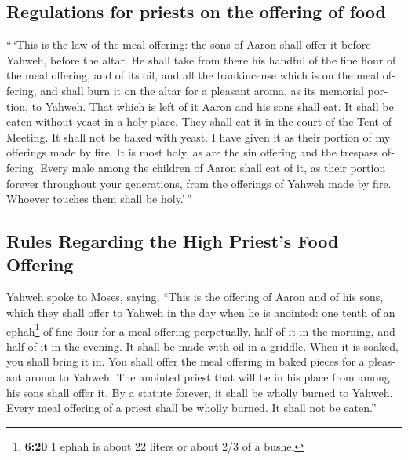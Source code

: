 \begin{paracol}{2}
\begin{otherlanguage}{english}
\hypertarget{regulations-for-priests-on-the-offering-of-food}{%
\subsection{Regulations for priests on the offering of
food}\label{regulations-for-priests-on-the-offering-of-food}}

 ``\,`This is the law of the meal offering: the sons of
Aaron shall offer it before Yahweh, before the altar.  He
shall take from there his handful of the fine flour of the meal
offering, and of its oil, and all the frankincense which is on the meal
offering, and shall burn it on the altar for a pleasant aroma, as its
memorial portion, to Yahweh.  That which is left of it
Aaron and his sons shall eat. It shall be eaten without yeast in a holy
place. They shall eat it in the court of the Tent of Meeting.
 It shall not be baked with yeast. I have given it as
their portion of my offerings made by fire. It is most holy, as are the
sin offering and the trespass offering.  Every male among
the children of Aaron shall eat of it, as their portion forever
throughout your generations, from the offerings of Yahweh made by fire.
Whoever touches them shall be holy.'\,''

\hypertarget{rules-regarding-the-high-priests-food-offering}{%
\subsection{Rules Regarding the High Priest's Food
Offering}\label{rules-regarding-the-high-priests-food-offering}}

 Yahweh spoke to Moses, saying,  ``This is
the offering of Aaron and of his sons, which they shall offer to Yahweh
in the day when he is anointed: one tenth of an ephah\footnote{\textbf{6:20}
  1 ephah is about 22 liters or about 2/3 of a bushel} of fine flour for
a meal offering perpetually, half of it in the morning, and half of it
in the evening.  It shall be made with oil in a griddle.
When it is soaked, you shall bring it in. You shall offer the meal
offering in baked pieces for a pleasant aroma to Yahweh. 
The anointed priest that will be in his place from among his sons shall
offer it. By a statute forever, it shall be wholly burned to Yahweh.
 Every meal offering of a priest shall be wholly burned.
It shall not be eaten.''


\end{otherlanguage}
\end{paracol}
